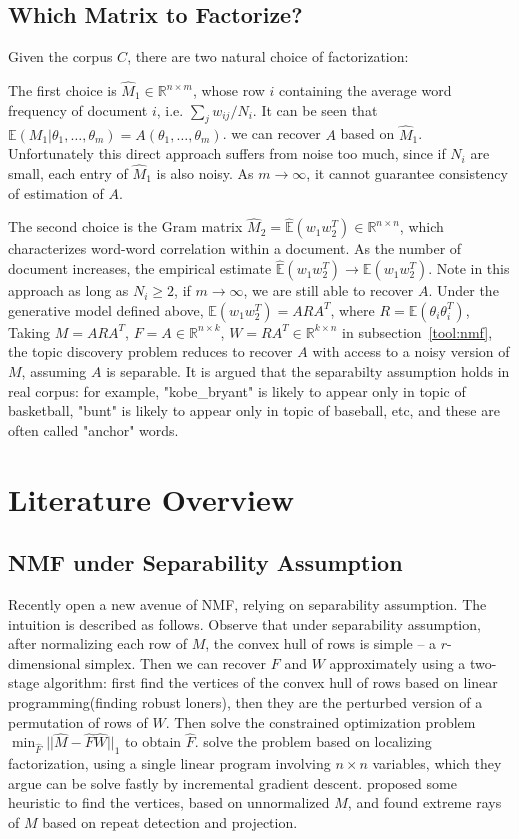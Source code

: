 \documentclass{article}
\def\R{\mathbb{R}}
\def\E{\mathbb{E}}
\begin{document}
\subsection{Which Matrix to Factorize?}
Given the corpus $C$, there are two natural choice of factorization:

The first choice is $\hat{M}_1 \in \R^{n \times m}$, whose row $i$ containing the average word frequency of document $i$, i.e. $\sum_j w_{ij}/ N_i$. It can be seen that $\E(M_1|\theta_1, \ldots, \theta_m) = A(\theta_1, \ldots, \theta_m)$. we can recover $A$ based on $\hat{M}_1$. Unfortunately this direct approach suffers from noise too much, since if $N_i$ are small, each entry of $\hat{M}_1$ is also noisy. As $m \to \infty$, it cannot guarantee consistency of estimation of $A$. 

The second choice is the Gram matrix $\hat{M}_2 = \hat{\E}(w_1 w_2^T) \in \R^{n \times n}$, which characterizes word-word correlation within a document. As the number of document increases, the empirical estimate $\hat{\E}(w_1 w_2^T) \rightarrow \E(w_1 w_2^T)$. Note in this approach as long as $N_i \ge 2$, if $m \to \infty$, we are still able to recover $A$. Under the generative model defined above, $\E(w_1 w_2^T) = ARA^T$, where $R = \E(\theta_i \theta_i^T)$, Taking $M = ARA^T$, $F = A \in \R^{n \times k}$, $W = RA^T \in \R^{k \times n}$ in subsection~\ref{tool:nmf}, the topic discovery problem reduces to recover $A$ with access to a noisy version of $M$, assuming $A$ is separable. It is argued that the separabilty assumption holds in real corpus: for example, "kobe\_bryant" is likely to appear only in topic of basketball, "bunt" is likely to appear only in topic of baseball, etc, and these are often called "anchor" words.

\section{Literature Overview}
\subsection{NMF under Separability Assumption}
Recently \cite{AGKM12} open a new avenue of NMF, relying on separability assumption. The intuition is described as follows. Observe that under separability assumption, after normalizing each row of $M$, the convex hull of rows is simple -- a $r$-dimensional simplex. Then we can recover $F$ and $W$ approximately using a two-stage algorithm: first find the vertices of the convex hull of rows based on linear programming(finding robust loners), then they are the perturbed version of a permutation of rows of $W$. Then solve the constrained optimization problem $\min_{\hat{F}} ||\hat{M}-\hat{F}\hat{W}||_1$ to obtain $\hat{F}$. \cite{BRRT12} solve the problem based on localizing factorization, using a single linear program involving $n \times n$ variables, which they argue can be solve fastly by incremental gradient descent. \cite{KSK12} proposed some heuristic to find the vertices, based on unnormalized $M$, and found extreme rays of $M$ based on repeat detection and projection. 
\end{document}
